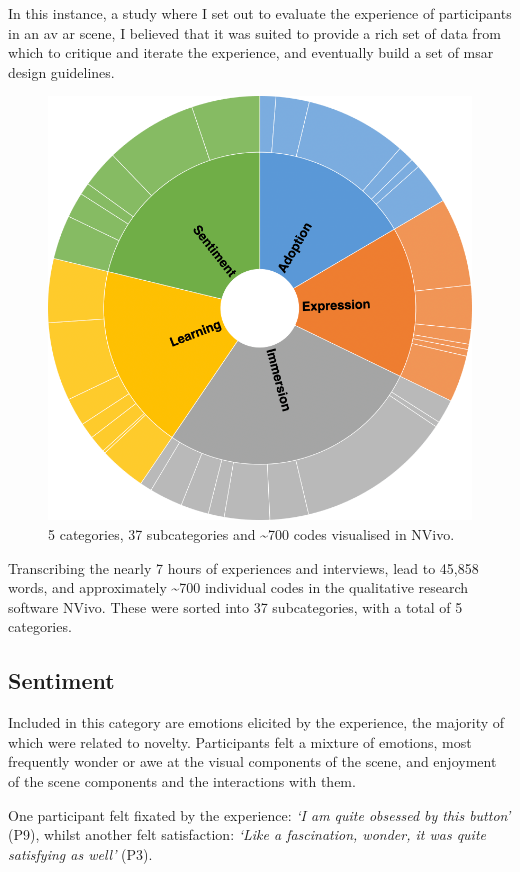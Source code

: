 In this instance, a study where I set out to evaluate the experience of participants in an \gls{av} \gls{ar} scene, I believed that it was suited to provide a rich set of data from which to critique and iterate the experience, and eventually build a set of \gls{msar} design guidelines.

\begin{figure}
    \centering
    \includegraphics[width=0.7\linewidth]{figures/06-polaris/polaris-feedback-grounded-codes.png}
    \caption{5 categories, 37 subcategories and \textasciitilde{}700 codes visualised in NVivo.}
    \label{fig: polaris-feedback-grounded-codes}
\end{figure}

Transcribing the nearly 7 hours of experiences and interviews, lead to 45,858 words, and approximately \textasciitilde{}700 individual codes in the qualitative research software NVivo. These were sorted into 37 subcategories, with a total of 5 categories.

\subsection{Sentiment}\label{sec: polaris-feedback-sentiment}
Included in this category are emotions elicited by the experience, the majority of which were related to novelty. Participants felt a mixture of emotions, most frequently wonder or awe at the visual components of the scene, and enjoyment of the scene components and the interactions with them.

One participant felt fixated by the experience: \textit{`I am quite obsessed by this button'} (P9), whilst another felt satisfaction: \textit{`Like a fascination, wonder, it was quite satisfying as well'} (P3).


